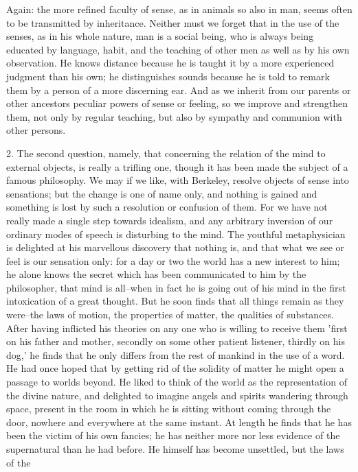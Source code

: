 Again: the more refined faculty of sense, as in animals so also in man,
seems often to be transmitted by inheritance. Neither must we forget
that in the use of the senses, as in his whole nature, man is a social
being, who is always being educated by language, habit, and the teaching
of other men as well as by his own observation. He knows distance
because he is taught it by a more experienced judgment than his own; he
distinguishes sounds because he is told to remark them by a person of
a more discerning ear. And as we inherit from our parents or other
ancestors peculiar powers of sense or feeling, so we improve and
strengthen them, not only by regular teaching, but also by sympathy and
communion with other persons.

2. The second question, namely, that concerning the relation of the mind
to external objects, is really a trifling one, though it has been made
the subject of a famous philosophy. We may if we like, with Berkeley,
resolve objects of sense into sensations; but the change is one of name
only, and nothing is gained and something is lost by such a resolution
or confusion of them. For we have not really made a single step towards
idealism, and any arbitrary inversion of our ordinary modes of speech is
disturbing to the mind. The youthful metaphysician is delighted at his
marvellous discovery that nothing is, and that what we see or feel is
our sensation only: for a day or two the world has a new interest to
him; he alone knows the secret which has been communicated to him by the
philosopher, that mind is all--when in fact he is going out of his mind
in the first intoxication of a great thought. But he soon finds that
all things remain as they were--the laws of motion, the properties of
matter, the qualities of substances. After having inflicted his theories
on any one who is willing to receive them 'first on his father and
mother, secondly on some other patient listener, thirdly on his dog,'
he finds that he only differs from the rest of mankind in the use of a
word. He had once hoped that by getting rid of the solidity of matter he
might open a passage to worlds beyond. He liked to think of the world as
the representation of the divine nature, and delighted to imagine angels
and spirits wandering through space, present in the room in which he is
sitting without coming through the door, nowhere and everywhere at the
same instant. At length he finds that he has been the victim of his own
fancies; he has neither more nor less evidence of the supernatural than
he had before. He himself has become unsettled, but the laws of the
